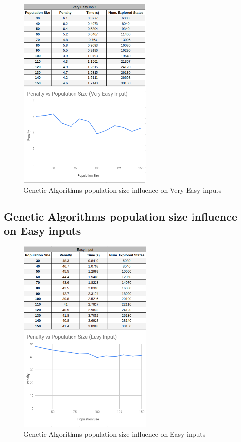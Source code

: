 \documentclass[conference]{IEEEtran}
\begin{document}
\begin{figure}[H]
    \centerline{\includegraphics[width=250px]{genetic_pop_size_very_easy.png}}
    \caption{Genetic Algorithms population size influence on Very Easy inputs}
\end{figure}

\subsection{Genetic Algorithms population size influence on Easy inputs}

\begin{figure}[H]
    \centerline{\includegraphics[width=250px]{genetic_pop_size_easy.png}}
    \caption{Genetic Algorithms population size influence on Easy inputs}
\end{figure}
\end{document}
